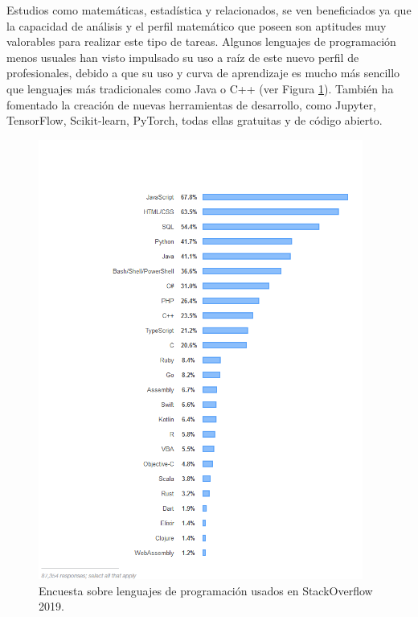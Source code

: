 Estudios como matemáticas, estadística y relacionados,
se ven beneficiados ya que la capacidad de análisis y el perfil matemático que poseen son aptitudes muy valorables para realizar este tipo de tareas.
Algunos lenguajes de programación menos usuales han visto impulsado su uso a raíz de este nuevo perfil de profesionales, debido a que su uso y curva de aprendizaje es mucho más sencillo que lenguajes más tradicionales como Java o C++ (ver Figura \ref{fig:Encuesta sobre lenguajes de programación en StackOverflow 2019}).
También ha fomentado la creación de nuevas herramientas de desarrollo, como Jupyter, TensorFlow, Scikit-learn, PyTorch, todas ellas gratuitas y de código abierto.

\begin{figure}
    \centering
    \includegraphics[width=0.95\textwidth]{images/chapter1/stackoverflow_language.png}
    \caption{Encuesta sobre lenguajes de programación usados en StackOverflow 2019.}
    \label{fig:Encuesta sobre lenguajes de programación en StackOverflow 2019}
\end{figure}

